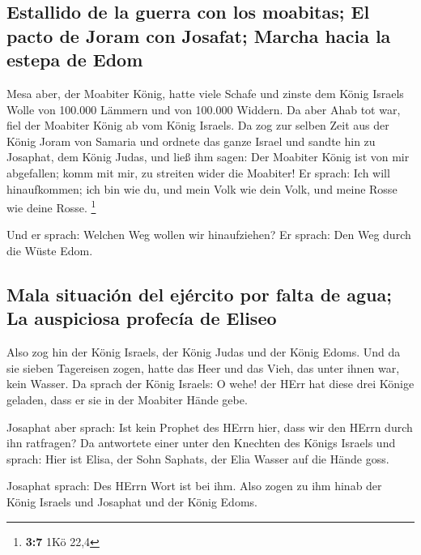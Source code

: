 \hypertarget{estallido-de-la-guerra-con-los-moabitas-el-pacto-de-joram-con-josafat-marcha-hacia-la-estepa-de-edom}{%
\subsection{Estallido de la guerra con los moabitas; El pacto de Joram
con Josafat; Marcha hacia la estepa de
Edom}\label{estallido-de-la-guerra-con-los-moabitas-el-pacto-de-joram-con-josafat-marcha-hacia-la-estepa-de-edom}}

 Mesa aber, der Moabiter König, hatte viele Schafe und
zinste dem König Israels Wolle von 100.000 Lämmern und von 100.000
Widdern.  Da aber Ahab tot war, fiel der Moabiter König ab
vom König Israels.  Da zog zur selben Zeit aus der König
Joram von Samaria und ordnete das ganze Israel  und sandte
hin zu Josaphat, dem König Judas, und ließ ihm sagen: Der Moabiter König
ist von mir abgefallen; komm mit mir, zu streiten wider die Moabiter! Er
sprach: Ich will hinaufkommen; ich bin wie du, und mein Volk wie dein
Volk, und meine Rosse wie deine Rosse. \footnote{\textbf{3:7} 1Kö 22,4}

 Und er sprach: Welchen Weg wollen wir hinaufziehen? Er
sprach: Den Weg durch die Wüste Edom.

\hypertarget{mala-situaciuxf3n-del-ejuxe9rcito-por-falta-de-agua-la-auspiciosa-profecuxeda-de-eliseo}{%
\subsection{Mala situación del ejército por falta de agua; La auspiciosa
profecía de
Eliseo}\label{mala-situaciuxf3n-del-ejuxe9rcito-por-falta-de-agua-la-auspiciosa-profecuxeda-de-eliseo}}

 Also zog hin der König Israels, der König Judas und der
König Edoms. Und da sie sieben Tagereisen zogen, hatte das Heer und das
Vieh, das unter ihnen war, kein Wasser.  Da sprach der
König Israels: O wehe! der HErr hat diese drei Könige geladen, dass er
sie in der Moabiter Hände gebe.

 Josaphat aber sprach: Ist kein Prophet des HErrn hier,
dass wir den HErrn durch ihn ratfragen? Da antwortete einer unter den
Knechten des Königs Israels und sprach: Hier ist Elisa, der Sohn
Saphats, der Elia Wasser auf die Hände goss.

 Josaphat sprach: Des HErrn Wort ist bei ihm. Also zogen
zu ihm hinab der König Israels und Josaphat und der König Edoms.

